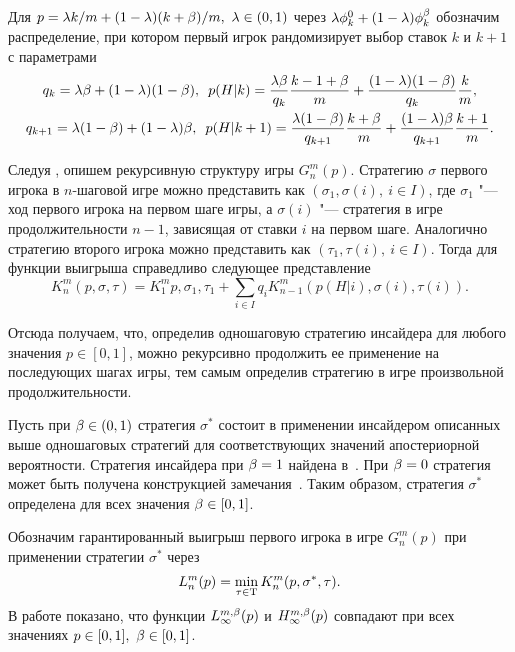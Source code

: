 Для $p = \lambda k/m + (1-\lambda) (k+\beta)/m,\ \lambda \in (0, 1)$ через $\lambda \phi^0_k + (1-\lambda)\phi^{\beta}_k$ обозначим распределение, при котором первый игрок рандомизирует выбор ставок $k$ и $k+1$ с параметрами
\begin{gather*}
  q_k = \lambda\beta + (1-\lambda)(1-\beta),\enskip
  p(H|k) = \frac{\lambda\beta}{q_k} \frac{k-1+\beta}{m} + \frac{(1-\lambda)(1-\beta)}{q_k} \frac{k}{m},\\
  q_{k+1} = \lambda(1-\beta) + (1-\lambda)\beta,\enskip
  p(H|k+1) = \frac{\lambda(1-\beta)}{q_{k+1}} \frac{k+\beta}{m} + \frac{(1-\lambda)\beta}{q_{k+1}} \frac{k+1}{m}.
\end{gather*}

Следуя \cite{domansky07}, опишем рекурсивную структуру игры $G^m_n(p)$.
Стратегию $\sigma$ первого игрока в $n$-шаговой игре можно представить как $(\sigma_1, \sigma(i),\ i \in I)$, где $\sigma_1$ "--- ход первого игрока на первом шаге игры, а $\sigma(i)$ "--- стратегия в игре продолжительности $n-1$, зависящая от ставки $i$ на первом шаге.
Аналогично стратегию второго игрока можно представить как $(\tau_1, \tau(i),\ i \in I)$.
Тогда для функции выигрыша справедливо следующее представление
\begin{equation}
  \label{ch1:eq:recursive-structure}
  K^m_n(p,\sigma,\tau) = 
  K^m_1{p,\sigma_1,\tau_1} + \sum_{i \in I} q_i K^m_{n-1}(p(H|i),\sigma(i),\tau(i)).
\end{equation}

Отсюда получаем, что, определив одношаговую стратегию инсайдера для любого значения $p \in [0,1]$, можно рекурсивно продолжить ее применение на последующих шагах игры, тем самым определив стратегию в игре произвольной продолжительности.

Пусть при $\beta \in (0,1)$ стратегия $\sigma^*$ состоит в применении инсайдером описанных выше одношаговых стратегий для соответствующих значений апостериорной вероятности. 
Стратегия инсайдера при $\beta = 1$ найдена в~\cite{domansky07}.
При $\beta = 0$ стратегия может быть получена конструкцией замечания~\label{ch1:rem:symm-payoffs}.
Таким образом, стратегия $\sigma^*$ определена для всех значения $\beta \in [0,1]$.

Обозначим гарантированный выигрыш первого игрока в игре $G^m_n(p)$ при применении стратегии $\sigma^*$ через
\begin{equation*}
  L^m_n(p) = \min_{\tau \in \mathrm{T}} K^m_n(p,\sigma^*,\tau).
\end{equation*}
В работе показано, что функции $L^{m,\beta}_\infty(p)$ и $H^{m,\beta}_\infty(p)$ совпадают при всех значениях $p \in [0,1],\ \beta \in [0,1]$.

